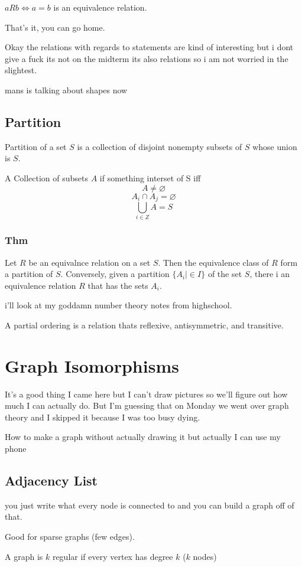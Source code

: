 \documentclass{report}
\begin{document}
$aRb \iff a = b$ is an equivalence relation.

That's it, you can go home.

Okay the relations with regards to statements are kind of interesting but i dont give a fuck its not on the midterm its also relations so i am not worried in the slightest.

mans is talking about shapes now

\section{Partition}
Partition of a set $S$ is a collection of disjoint nonempty subsets of $S$ whose union is $S$.

A Collection of subsets $A$ if something interset of S iff
\[
A \neq \varnothing
\]
\[
A_i \cap A_j = \varnothing
\]
\[
\underset{i \in Z}{\bigcup} A = S
\]
\subsection{Thm}
Let $R$ be an equivalnce relation on a set $S$. Then the equivalence class of $R$ form a partition of $S$. Conversely, given a partition $\{A_i | \in I \}$ of the set $S$, there i an equivalence relation $R$ that has the sets $A_i$.

i'll look at my goddamn number theory notes from highschool.

A partial ordering is a relation thats reflexive, antisymmetric, and transitive.


\chapter{Graph Isomorphisms}
It's a good thing I came here but I can't draw pictures so we'll figure out how much I can actually do. But I'm guessing that on Monday we went over graph theory and I skipped it because I was too busy dying.

How to make a graph without actually drawing it but actually I can use my phone

\section{Adjacency List}
you just write what every node is connected to and you can build a graph off of that.

Good for sparse graphs (few edges).

A graph is $k$ regular if every vertex has degree $k$ ($k$ nodes)
\end{document}
